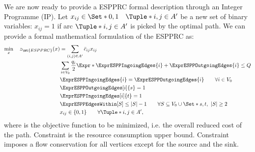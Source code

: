 We are now ready to provide a ESPPRC formal description through an Integer Programme (IP).
Let $x_{ij} \in \Set*{0, 1} \quad \Tuple*{i, j} \in A^\prime$ be a new set of binary variables:
$x_{ij} = 1$ if arc $\Tuple*{i, j} \in A^\prime$ is picked by the optimal path.
We can provide a formal mathematical formulation of the ESPPRC as:
\begin{align}
	\min_{x} \quad z_\mt{ESPPRC}(x) & =  \sum_{(i, j) \in A^\prime} \bar{c}_{ij} x_{ij} \label{eq:espprc-obj-function}                                                                                                                   \\
	                                & \sum_{i \in V_0} \frac{q_i}{2} \Expr*{ \ExprESPPIngoingEdges{i} + \ExprESPPOutgoingEdges{i} }  \le Q                            \label{eq:espprc-resource-upper-bound-constraint}                  \\
	                                & \ExprESPPIngoingEdges{i} = \ExprESPPOutgoingEdges{i}                                                \qquad \forall i \in V_0          \label{eq:espprc-flow-conservation-constraint-customers}     \\
	                                & \ExprESPPOutgoingEdges[i]{s} = 1                                                                                                      \label{eq:espprc-source-emitting-flow}                       \\
	                                & \ExprESPPIngoingEdges[i]{t} = 1                                                                                                       \label{eq-espprc-sink-consuming-flow}                        \\
	                                & \ExprESPPEdgesWithin[S] \le |S| - 1                                                                  \qquad \forall S \subseteq V_0 \cup \Set*{s, t},\ |S| \ge 2 \label{eq:espprc-sec-constraints} \\
	                                & x_{ij}                   \in \lbrace 0, 1 \rbrace                                                    \qquad \forall \Tuple*{i, j} \in A^\prime    \label{eq:espprc-x-mip-var-bounds},
\end{align}
where  is the objective function to be minimized, i.e. the overall reduced cost of the path.
Constraint  is the resource consumption upper bound.
Constraint  imposes a flow conservation for all vertices except for the source and the sink.
